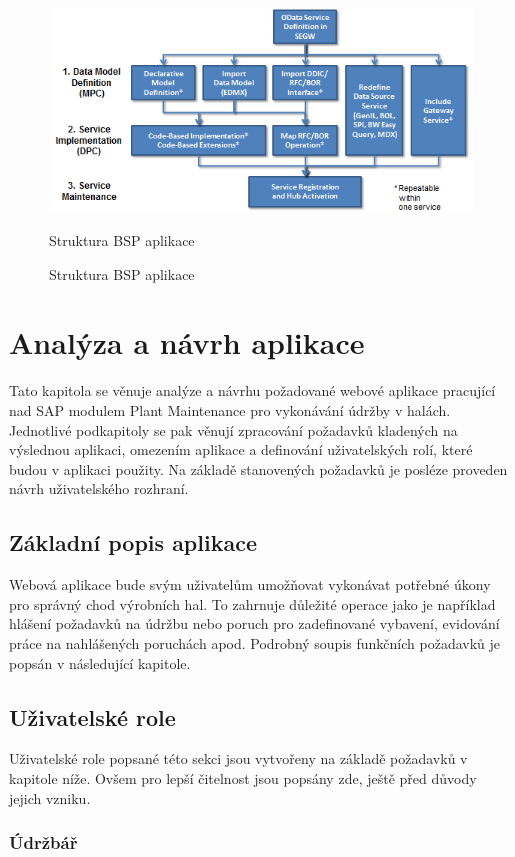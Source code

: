 \documentclass[thesis=M,czech]{FITthesis}[2012/06/26]
\begin{document}
\begin{figure}[H]
	\centering
	\includegraphics[width=1\textwidth]{images/odata.png}
	\caption{Struktura BSP aplikace}
	\label{img:bsp}
	\small
	Struktura BSP aplikace
\end{figure}

\chapter{Analýza a návrh aplikace}
Tato kapitola se věnuje analýze a návrhu požadované webové aplikace pracující nad SAP modulem Plant Maintenance pro vykonávání údržby v halách. Jednotlivé podkapitoly se pak věnují zpracování požadavků kladených na výslednou aplikaci, omezením aplikace a definování uživatelských rolí, které budou v aplikaci použity. Na základě stanovených požadavků je posléze proveden návrh uživatelského rozhraní.  


\section{Základní popis aplikace}
Webová aplikace bude svým uživatelům umožňovat vykonávat potřebné úkony pro správný chod výrobních hal. To zahrnuje důležité operace jako je například hlášení požadavků na údržbu nebo poruch pro zadefinované vybavení, evidování práce na nahlášených poruchách apod. Podrobný soupis funkčních požadavků je popsán v následující kapitole. 


\section{Uživatelské role}
Uživatelské role popsané této sekci jsou vytvořeny na základě požadavků v kapitole níže. Ovšem pro lepší čitelnost jsou popsány zde, ještě před důvody jejich vzniku. 
\subsection{Údržbář}
\end{document}

